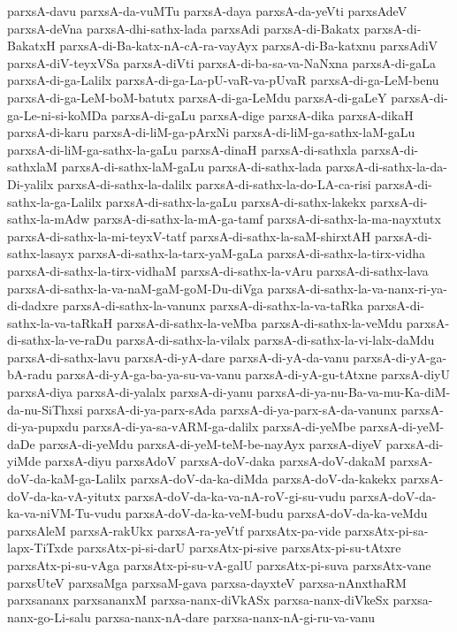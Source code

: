 {parxsA-davu
parxsA-da-vuMTu
parxsA-daya
parxsA-da-yeVti
parxsAdeV
parxsA-deVna
parxsA-dhi-sathx-lada
parxsAdi
parxsA-di-Bakatx
parxsA-di-BakatxH
parxsA-di-Ba-katx-nA-cA-ra-vayAyx
parxsA-di-Ba-katxnu
parxsAdiV
parxsA-diV-teyxVSa
parxsA-diVti
parxsA-di-ba-sa-va-NaNxna
parxsA-di-gaLa
parxsA-di-ga-Lalilx
parxsA-di-ga-La-pU-vaR-va-pUvaR
parxsA-di-ga-LeM-benu
parxsA-di-ga-LeM-boM-batutx
parxsA-di-ga-LeMdu
parxsA-di-gaLeY
parxsA-di-ga-Le-ni-si-koMDa
parxsA-di-gaLu
parxsA-dige
parxsA-dika
parxsA-dikaH
parxsA-di-karu
parxsA-di-liM-ga-pArxNi
parxsA-di-liM-ga-sathx-laM-gaLu
parxsA-di-liM-ga-sathx-la-gaLu
parxsA-dinaH
parxsA-di-sathxla
parxsA-di-sathxlaM
parxsA-di-sathx-laM-gaLu
parxsA-di-sathx-lada
parxsA-di-sathx-la-da-Di-yalilx
parxsA-di-sathx-la-dalilx
parxsA-di-sathx-la-do-LA-ca-risi
parxsA-di-sathx-la-ga-Lalilx
parxsA-di-sathx-la-gaLu
parxsA-di-sathx-lakekx
parxsA-di-sathx-la-mAdw
parxsA-di-sathx-la-mA-ga-tamf
parxsA-di-sathx-la-ma-nayxtutx
parxsA-di-sathx-la-mi-teyxV-tatf
parxsA-di-sathx-la-saM-shirxtAH
parxsA-di-sathx-lasayx
parxsA-di-sathx-la-tarx-yaM-gaLa
parxsA-di-sathx-la-tirx-vidha
parxsA-di-sathx-la-tirx-vidhaM
parxsA-di-sathx-la-vAru
parxsA-di-sathx-lava
parxsA-di-sathx-la-va-naM-gaM-goM-Du-diVga
parxsA-di-sathx-la-va-nanx-ri-ya-di-dadxre
parxsA-di-sathx-la-vanunx
parxsA-di-sathx-la-va-taRka
parxsA-di-sathx-la-va-taRkaH
parxsA-di-sathx-la-veMba
parxsA-di-sathx-la-veMdu
parxsA-di-sathx-la-ve-raDu
parxsA-di-sathx-la-vilalx
parxsA-di-sathx-la-vi-lalx-daMdu
parxsA-di-sathx-lavu
parxsA-di-yA-dare
parxsA-di-yA-da-vanu
parxsA-di-yA-ga-bA-radu
parxsA-di-yA-ga-ba-ya-su-va-vanu
parxsA-di-yA-gu-tAtxne
parxsA-diyU
parxsA-diya
parxsA-di-yalalx
parxsA-di-yanu
parxsA-di-ya-nu-Ba-va-mu-Ka-diM-da-nu-SiThxsi
parxsA-di-ya-parx-sAda
parxsA-di-ya-parx-sA-da-vanunx
parxsA-di-ya-pupxdu
parxsA-di-ya-sa-vARM-ga-dalilx
parxsA-di-yeMbe
parxsA-di-yeM-daDe
parxsA-di-yeMdu
parxsA-di-yeM-teM-be-nayAyx
parxsA-diyeV
parxsA-di-yiMde
parxsA-diyu
parxsAdoV
parxsA-doV-daka
parxsA-doV-dakaM
parxsA-doV-da-kaM-ga-Lalilx
parxsA-doV-da-ka-diMda
parxsA-doV-da-kakekx
parxsA-doV-da-ka-vA-yitutx
parxsA-doV-da-ka-va-nA-roV-gi-su-vudu
parxsA-doV-da-ka-va-niVM-Tu-vudu
parxsA-doV-da-ka-veM-budu
parxsA-doV-da-ka-veMdu
parxsAleM
parxsA-rakUkx
parxsA-ra-yeVtf
parxsAtx-pa-vide
parxsAtx-pi-sa-lapx-TiTxde
parxsAtx-pi-si-darU
parxsAtx-pi-sive
parxsAtx-pi-su-tAtxre
parxsAtx-pi-su-vAga
parxsAtx-pi-su-vA-galU
parxsAtx-pi-suva
parxsAtx-vane
parxsUteV
parxsaMga
parxsaM-gava
parxsa-dayxteV
parxsa-nAnxthaRM
parxsananx
parxsananxM
parxsa-nanx-diVkASx
parxsa-nanx-diVkeSx
parxsa-nanx-go-Li-salu
parxsa-nanx-nA-dare
parxsa-nanx-nA-gi-ru-va-vanu
}
